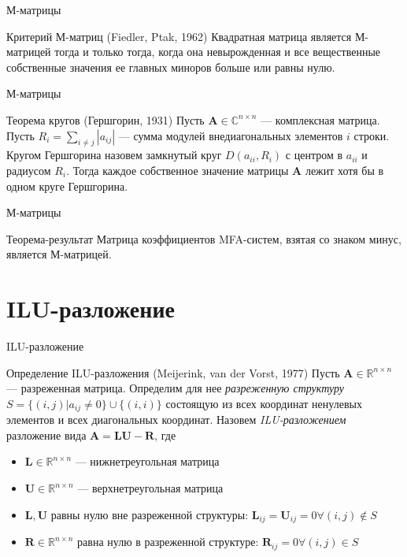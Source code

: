 \documentclass[aspectratio=169]{beamer}
\begin{document}
\begin{frame}{М-матрицы}
\begin{block}{Критерий М-матриц (Fiedler, Ptak, 1962)}
	Квадратная матрица является М-матрицей тогда и только тогда, когда она невырожденная и все вещественные собственные значения ее главных миноров больше или равны нулю. 
\end{block}
\end{frame}

\begin{frame}{М-матрицы}
\begin{block}{Теорема кругов (Гершгорин, 1931)}
	Пусть $\mathbf{A} \in \mathbb{C}^{n \times n}$ --- комплексная матрица. Пусть $R_i = \sum_{i \neq j} |a_{ij}|$ --- сумма модулей внедиагональных элементов $i$ строки. Кругом Гершгорина назовем замкнутый круг $D(a_{ii}, R_i)$ с центром в $a_{ii}$ и радиусом $R_i$. Тогда каждое собственное значение матрицы $\mathbf{A}$ лежит хотя бы в одном круге Гершгорина. 
\end{block}
\end{frame}

\begin{frame}{М-матрицы}
\begin{block}{Теорема-результат}
	Матрица коэффициентов MFA-систем, взятая со знаком минус, является М-матрицей.
\end{block}
\end{frame}

\section{ILU-разложение}
\begin{frame}{ILU-разложение}
\begin{block}{Определение ILU-разложения (Meijerink, van der Vorst, 1977)}
	Пусть $\mathbf{A} \in \mathbb{R}^{n \times n}$ --- разреженная матрица. Определим для нее \emph{разреженную структуру} $S = \{(i, j) | a_{ij} \neq 0\} \cup \{(i,i)\}$ состоящую из всех координат ненулевых элементов и всех диагональных координат. Назовем \emph{ILU-разложением} разложение вида $\mathbf{A} = \mathbf{L}\mathbf{U} - \mathbf{R}$, где
	\begin{itemize}
		\item $\mathbf{L} \in \mathbb{R}^{n \times n}$ --- нижнетреугольная матрица
		\item $\mathbf{U} \in \mathbb{R}^{n \times n}$ --- верхнетреугольная матрица
		\item $\mathbf{L}, \mathbf{U}$ равны нулю вне разреженной структуры: $\mathbf{L}_{ij} = \mathbf{U}_{ij} = 0 \forall (i, j) \notin S$
		\item $\mathbf{R} \in \mathbb{R}^{n \times n}$ равна нулю в разреженной структуре: $\mathbf{R}_{ij} = 0 \forall (i, j) \in S$
	\end{itemize}
\end{block}
\end{frame}
\end{document}

